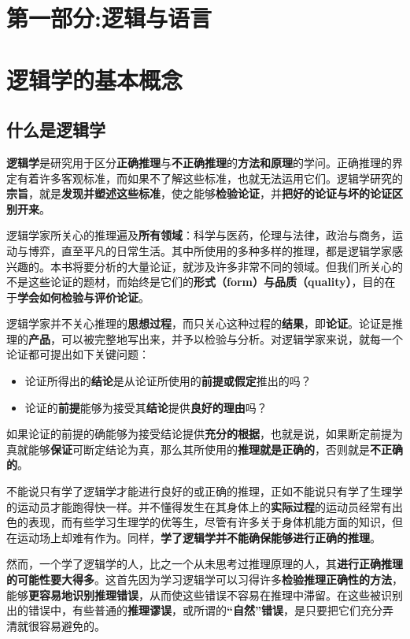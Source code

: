 \section*{第一部分:逻辑与语言}

\section{逻辑学的基本概念}

\subsection{什么是逻辑学}
\textbf{逻辑学}是研究用于区分\textbf{正确推理}与\textbf{不正确推理}的\textbf{方法和原理}的学问。正确推理的界定有着许多客观标准，而如果不了解这些标准，也就无法运用它们。逻辑学研究的\textbf{宗旨}，就是\textbf{发现并塑述这些标准}，使之能够\textbf{检验论证}，并\textbf{把好的论证与坏的论证区别开来}。

逻辑学家所关心的推理遍及\textbf{所有领域}：科学与医药，伦理与法律，政治与商务，运动与博弈，直至平凡的日常生活。其中所使用的多种多样的推理，都是逻辑学家感兴趣的。本书将要分析的大量论证，就涉及许多非常不同的领域。但我们所关心的不是这些论证的题材，而始终是它们的\textbf{形式（form）与品质（quality）}，目的在于\textbf{学会如何检验与评价论证}。

逻辑学家并不关心推理的\textbf{思想过程}，而只关心这种过程的\textbf{结果}，即\textbf{论证}。论证是推理的\textbf{产品}，可以被完整地写出来，并予以检验与分析。对逻辑学家来说，就每一个论证都可提出如下关键问题：
\begin{itemize}
    \item 论证所得出的\textbf{结论}是从论证所使用的\textbf{前提或假定}推出的吗？
    \item 论证的\textbf{前提}能够为接受其\textbf{结论}提供\textbf{良好的理由}吗？
\end{itemize}
如果论证的前提的确能够为接受结论提供\textbf{充分的根据}，也就是说，如果断定前提为真就能够\textbf{保证}可断定结论为真，那么其所使用的\textbf{推理就是正确的}，否则就是\textbf{不正确的}。

不能说只有学了逻辑学才能进行良好的或正确的推理，正如不能说只有学了生理学的运动员才能跑得快一样。并不懂得发生在其身体上的\textbf{实际过程}的运动员经常有出色的表现，而有些学习生理学的优等生，尽管有许多关于身体机能方面的知识，但在运动场上却难有作为。同样，\textbf{学了逻辑学并不能确保能够进行正确的推理}。

然而，一个学了逻辑学的人，比之一个从未思考过推理原理的人，其\textbf{进行正确推理的可能性要大得多}。这首先因为学习逻辑学可以习得许多\textbf{检验推理正确性的方法}，能够\textbf{更容易地识别推理错误}，从而使这些错误不容易在推理中滞留。在这些被识别出的错误中，有些普通的\textbf{推理谬误}，或所谓的\textbf{“自然”错误}，是只要把它们充分弄清就很容易避免的。

